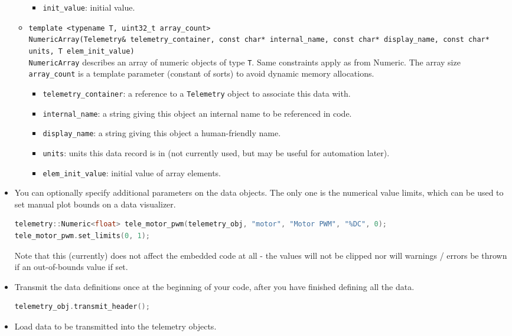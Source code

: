 \documentclass[11pt]{article}
\begin{document}
\begin{itemize}
\begin{itemize}
\begin{itemize}
      \item \texttt{init\_value}: initial value.
    \end{itemize}
    \item \texttt{template <typename T, uint32\_t array\_count>\\ NumericArray(Telemetry\& telemetry\_container, const char* internal\_name, const char* display\_name, const char* units, T elem\_init\_value)} \\
    \texttt{NumericArray} describes an array of numeric objects of type \texttt{T}. Same constraints apply as from Numeric. The array size \texttt{array\_count} is a template parameter (constant of sorts) to avoid dynamic memory allocations.
    \begin{itemize}
      \item \texttt{telemetry\_container}: a reference to a \texttt{Telemetry} object to associate this data with.
      \item \texttt{internal\_name}: a string giving this object an internal name to be referenced in code.
      \item \texttt{display\_name}: a string giving this object a human-friendly name.
      \item \texttt{units}: units this data record is in (not currently used, but may be useful for automation later).
      \item \texttt{elem\_init\_value}: initial value of array elements.
    \end{itemize}
  \end{itemize}
  \item You can optionally specify additional parameters on the data objects. The only one is the numerical value limits, which can be used to set manual plot bounds on a data visualizer.
\begin{lstlisting}[language=C++]
telemetry::Numeric<float> tele_motor_pwm(telemetry_obj, "motor", "Motor PWM", "%DC", 0);
tele_motor_pwm.set_limits(0, 1);
\end{lstlisting}
  Note that this (currently) does not affect the embedded code at all - the values will not be clipped nor will warnings / errors be thrown if an out-of-bounds value if set.
  \item Transmit the data definitions once at the beginning of your code, after you have finished defining all the data.
  \begin{lstlisting}[language=C++]
telemetry_obj.transmit_header();
  \end{lstlisting}
  \item Load data to be transmitted into the telemetry objects. \\

\end{itemize}
\end{document}
